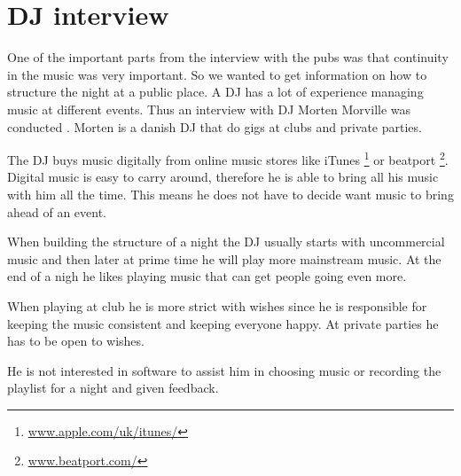 \section{DJ interview}
One of the important parts from the interview with the pubs was that continuity in the music was very important. So we wanted to get information on how to structure the night at a public place. A DJ has a lot of experience managing music at different events. Thus an interview with DJ Morten Morville was conducted \cite{int_dj}. Morten is a danish DJ that do gigs at clubs and private parties.


The DJ buys music digitally from online music stores like iTunes \footnote{\url{www.apple.com/uk/itunes/}} or beatport \footnote{\url{www.beatport.com/}}. Digital music is easy to carry around, therefore he is able to bring all his music with him all the time. This means he does not have to decide want music to bring ahead of an event. 

When building the structure of a night the DJ usually starts with uncommercial  music and then later at prime time he will play more mainstream music. At the end of a nigh he likes playing music that can get people going even more.

When playing at club he is more strict with wishes since he is responsible for keeping the music consistent and keeping everyone happy. At private parties he has to be open to wishes.

He is not interested in software to assist him in choosing music or recording the playlist for a night and given feedback.

